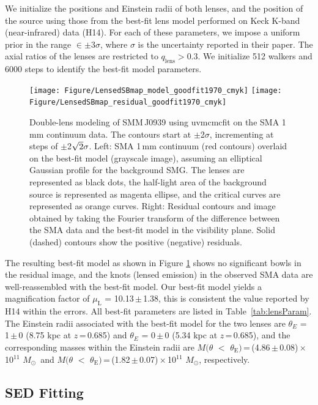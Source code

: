 \documentclass[iop]{emulateapj}
\newcommand{\Msun}{\mbox{$M_{\odot}$}}
\begin{document}
We initialize the positions and Einstein radii of both lenses, and the position of the source using those
 from the best-fit lens model performed on Keck K-band (near-infrared) data (H14). For each of
these parameters, we impose a uniform prior in the range $\in\pm$3$\sigma$, where $\sigma$ is the uncertainty
reported in their paper. The axial ratios of the lenses are restricted to $q_\textrm{lens} > 0.3$. We initialize 512
walkers and 6000 steps to identify the best-fit model parameters.
\begin{figure}[!tbpH]
\centering
\texttt{[image: Figure/LensedSBmap\_model\_goodfit1970\_cmyk]}
\texttt{[image: Figure/LensedSBmap\_residual\_goodfit1970\_cmyk]}
\caption{Double-lens modeling of SMM\,J0939 using {\sc uvmcmcfit} on the SMA 1\,mm continuum data.
The contours start at $\pm$2$\sigma$, incrementing at
steps of $\pm$2$\sqrt{\rm 2}\sigma$. Left: SMA 1\,mm continuum (red contours) overlaid on the best-fit model (grayscale image), assuming an elliptical Gaussian profile for the background SMG. The lenses are represented as black dots, the half-light area of the background source is represented as magenta ellipse, and the critical curves are represented as orange curves.
Right: Residual contours and image obtained by taking the Fourier transform of the difference between the SMA data and the best-fit model in the visibility plane. Solid (dashed) contours show the positive (negative) residuals.\label{fig:lens}}
\end{figure}

The resulting best-fit model as shown in Figure\,\,\ref{fig:lens} shows no significant bowls in the residual
image, and the knots (lensed emission) in the observed SMA data are well-reassembled with the best-fit model.
Our best-fit model yields a magnification
factor of $\mu_\textrm{L}$ = 10.13\,$\pm$\,1.38, this is consistent the value reported by H14 within the errors. All best-fit
parameters are listed in Table~\ref{tab:lensParam}. The Einstein radii associated with the best-fit model for the two lenses are $\theta_{E}$ = 1\,$\pm$\,0 (8.75 kpc at $z$\,=\,0.685) and $\theta_{E}$ = 0\,$\pm$\,0 (5.34\,\,kpc at $z$\,=\,0.685), and
the corresponding masses within the Einstein radii are $M(\theta$\,\,$<$\,\,$\theta_\textrm{E})$\,=\,(4.86\,$\pm$\,0.08)\,$\times$\,10$^{11}$\,\,\Msun\ and $M(\theta$\,\,$<$\,\,$\theta_\textrm{E})$\,=\,(1.82\,$\pm$\,0.07)\,$\times$\,10$^{11}$\,\,\Msun, respectively.


\subsection{SED Fitting} \label{sec:SED}
\end{document}
